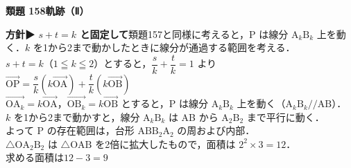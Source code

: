 \documentclass[a4paper,11pt]{ltjsarticle}
\newcommand{\ans}[2]{\Needspace{5\baselineskip}\vspace{6pt}%
  {\sffamily\bfseries 類題 #1\quad #2}\par}
\newcommand{\point}[1]{\textsf{\bfseries ▶ #1}}
\begin{document}
\ans{158}{軌跡（Ⅱ）}
\begin{kai}
\textbf{方針}\quad \point{$s+t=k$ と固定して}類題157と同様に考えると，P は線分 $\mathrm A_k\mathrm B_k$ 上を動く．$k$ を1から2まで動かしたときに線分が通過する範囲を考える．\\[2pt]
$s+t=k$（$1\leqq k\leqq2$）とすると，$\dfrac sk+\dfrac tk=1$ より\\
\hspace*{1.5em}$\overrightarrow{\mathrm{OP}}=\dfrac sk(k\overrightarrow{\mathrm{OA}})+\dfrac tk(k\overrightarrow{\mathrm{OB}})$\\
$\overrightarrow{\mathrm{OA}_k}=k\overrightarrow{\mathrm{OA}}$，$\overrightarrow{\mathrm{OB}_k}=k\overrightarrow{\mathrm{OB}}$ とすると，P は線分 $\mathrm A_k\mathrm B_k$ 上を動く（$\mathrm A_k\mathrm B_k/\!/\mathrm{AB}$）．\\[2pt]
$k$ を1から2まで動かすと，線分 $\mathrm A_k\mathrm B_k$ は AB から $\mathrm A_2\mathrm B_2$ まで平行に動く．\\
よって P の存在範囲は，台形 $\mathrm{ABB_2A_2}$ の周および内部．\\[2pt]
$\triangle\mathrm{OA_2B_2}$ は $\triangle\mathrm{OAB}$ を2倍に拡大したもので，面積は $2^2\times3=12$．\\
求める面積は\quad $12-3=9$
\begin{center}
\end{center}
\end{kai}
\end{document}
